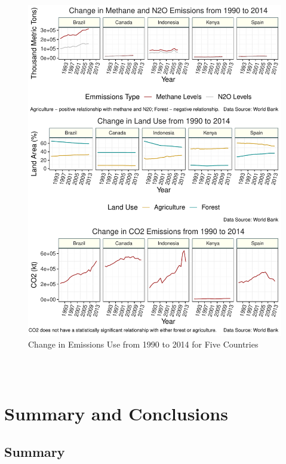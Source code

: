 \documentclass[12pt,]{article}
\begin{document}
\begin{figure}
\centering
\includegraphics{Marx_ENV872_Project_files/figure-latex/unnamed-chunk-13-1.pdf}
\caption{\label{fig:fig7}Change in Emissions Use from 1990 to 2014 for
Five Countries}
\end{figure}

\begin{verbatim}


\end{verbatim}

\begin{verbatim}

\end{verbatim}

\newpage

\section{Summary and Conclusions}\label{summary-and-conclusions}

\subsection{Summary}\label{summary}
\end{document}
